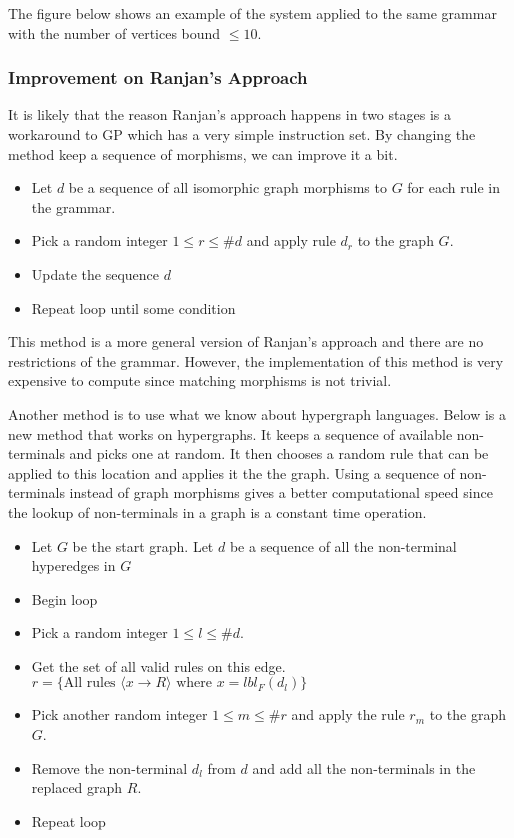 \documentclass{article}
\begin{document}
  The figure below shows an example of the system applied to the same grammar with the number of vertices bound $\leq 10$.
  

  \subsubsection{Improvement on Ranjan's Approach}

  It is likely that the reason Ranjan's approach happens in two stages is a workaround to GP which has a very simple instruction set. By changing the method keep a sequence of morphisms, we can improve it a bit.

  \begin{itemize}
  \item Let $d$ be a sequence of all isomorphic graph morphisms to $G$ for each rule in the grammar.
  \item Pick a random integer $1 \leq r \leq \#d$ and apply rule $d_r$ to the graph $G$.
  \item Update the sequence $d$
  \item Repeat loop until some condition
  \end{itemize}

  This method is a more general version of Ranjan's approach and there are no restrictions of the grammar. However, the implementation of this method is very expensive to compute since matching morphisms is not trivial.

  Another method is to use what we know about hypergraph languages. Below is a new method that works on hypergraphs. It keeps a sequence of available non-terminals and picks one at random. It then chooses a random rule that can be applied to this location and applies it the the graph. Using a sequence of non-terminals instead of graph morphisms gives a better computational speed since the lookup of non-terminals in a graph is a constant time operation.

  \begin{itemize}
  \item Let $G$ be the start graph. Let $d$ be a sequence of all the non-terminal hyperedges in $G$
  \item Begin loop
  \item Pick a random integer $1 \leq l \leq \#d$.
  \item Get the set of all valid rules on this edge. $r = \{\textrm{All rules $\langle x \to R \rangle$ where $x = lbl_F(d_l)$\}}$
  \item Pick another random integer $1 \leq m \leq \#r$ and apply the rule $r_m$ to the graph $G$.
  \item Remove the non-terminal $d_l$ from $d$ and add all the non-terminals in the replaced graph $R$.
  \item Repeat loop
  \end{itemize}
{}

\end{document}
